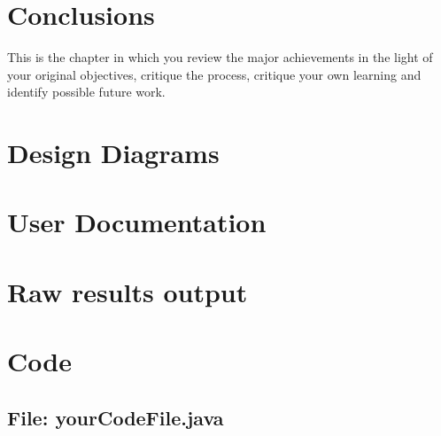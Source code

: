 \documentclass[11pt,openright,a4paper]{report}
\begin{document}

\chapter{Conclusions}
%

This is the chapter in which you review the major achievements in the
light of your original objectives, critique the process, critique your
own learning and identify possible future work.



\appendix


\chapter{Design Diagrams}

\chapter{User Documentation}

\chapter{Raw results output}

\chapter{Code}


\begin{landscape}
\begin{multicols}{2}
\section{File: yourCodeFile.java}

\end{multicols}
\end{landscape}
\end{document}
